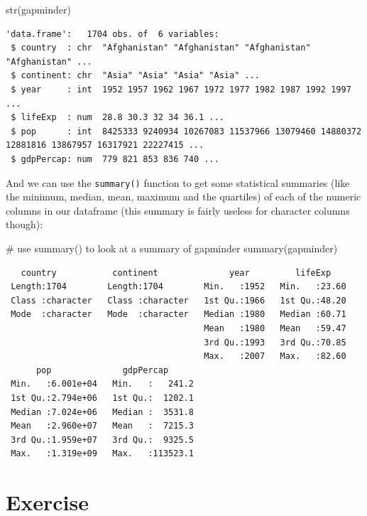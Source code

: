 \documentclass[
  letterpaper,
  DIV=11,
  numbers=noendperiod]{scrreprt}
\newenvironment{Shaded}{\begin{snugshade}}{\end{snugshade}}
\newcommand{\CommentTok}[1]{\textcolor[rgb]{0.37,0.37,0.37}{#1}}
\newcommand{\FunctionTok}[1]{\textcolor[rgb]{0.28,0.35,0.67}{#1}}
\newcommand{\NormalTok}[1]{\textcolor[rgb]{0.00,0.23,0.31}{#1}}
\begin{document}
\begin{Shaded}
\begin{Highlighting}[]
\FunctionTok{str}\NormalTok{(gapminder)}
\end{Highlighting}
\end{Shaded}

\begin{verbatim}
'data.frame':   1704 obs. of  6 variables:
 $ country  : chr  "Afghanistan" "Afghanistan" "Afghanistan" "Afghanistan" ...
 $ continent: chr  "Asia" "Asia" "Asia" "Asia" ...
 $ year     : int  1952 1957 1962 1967 1972 1977 1982 1987 1992 1997 ...
 $ lifeExp  : num  28.8 30.3 32 34 36.1 ...
 $ pop      : int  8425333 9240934 10267083 11537966 13079460 14880372 12881816 13867957 16317921 22227415 ...
 $ gdpPercap: num  779 821 853 836 740 ...
\end{verbatim}

And we can use the \texttt{summary()} function to get some statistical
summaries (like the minimum, median, mean, maximum and the quartiles) of
each of the numeric columns in our dataframe (this summary is fairly
useless for character columns though):

\begin{Shaded}
\begin{Highlighting}[]
\CommentTok{\# use summary() to look at a summary of gapminder}
\FunctionTok{summary}\NormalTok{(gapminder)}
\end{Highlighting}
\end{Shaded}

\begin{verbatim}
   country           continent              year         lifeExp     
 Length:1704        Length:1704        Min.   :1952   Min.   :23.60  
 Class :character   Class :character   1st Qu.:1966   1st Qu.:48.20  
 Mode  :character   Mode  :character   Median :1980   Median :60.71  
                                       Mean   :1980   Mean   :59.47  
                                       3rd Qu.:1993   3rd Qu.:70.85  
                                       Max.   :2007   Max.   :82.60  
      pop              gdpPercap       
 Min.   :6.001e+04   Min.   :   241.2  
 1st Qu.:2.794e+06   1st Qu.:  1202.1  
 Median :7.024e+06   Median :  3531.8  
 Mean   :2.960e+07   Mean   :  7215.3  
 3rd Qu.:1.959e+07   3rd Qu.:  9325.5  
 Max.   :1.319e+09   Max.   :113523.1  
\end{verbatim}

\section{Exercise}
\end{document}
